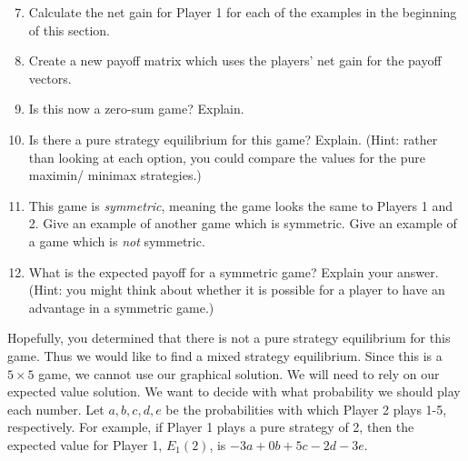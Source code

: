 \begin{enumerate}
\setcounter{enumi}{6} 
\item Calculate the net gain for Player 1 for each of the examples in the beginning of this section.

\item Create a new payoff matrix which uses the players' net gain for the payoff vectors.

\item Is this now a zero-sum game? Explain.

\item Is there a pure strategy equilibrium for this game? Explain. (Hint: rather than looking at each option, you could compare the values for the pure maximin/ minimax strategies.)

\item This game is {\it symmetric}, meaning the game looks the same to Players 1 and 2. Give an example of another game which is symmetric. Give an example of a game which is {\it not} symmetric.

\item What is the expected payoff for a symmetric game? Explain your answer. (Hint: you might think about whether it is possible for a player to have an advantage in a symmetric game.)

\end{enumerate}

Hopefully, you determined that there is not a pure strategy equilibrium for this game. Thus we would like to find a mixed strategy equilibrium. Since this is a $5 \times 5$ game, we cannot use our graphical solution. We will need to rely on our expected value solution. We want to decide with what probability we should play each number. Let $a, b, c, d, e$ be the probabilities with which Player 2 plays 1-5, respectively. For example, if Player 1 plays a pure strategy of 2, then the expected value for Player 1, $E_1(2)$, is $-3a+0b+5c-2d-3e$. 


